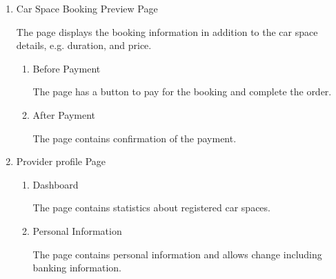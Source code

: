 \documentclass[12pt]{article}
\begin{document}
\begin{enumerate}
    \item
    \begin{description}
      \item[Car Space Booking Preview Page]
    \end{description}

    The page displays the booking information in addition to the car space details, e.g. duration, and price.

      \begin{enumerate}
        \item
        \begin{description}
          \item[Before Payment]
        \end{description}
  
        The page has a button to pay for the booking and complete the order.
  
        \item     
        \begin{description}
          \item[After Payment]
        \end{description}
  
        The page contains confirmation of the payment.
  
      \end{enumerate}

    \item
    \begin{description}
      \item[Provider profile Page]
    \end{description}

      \begin{enumerate}
        \item
        \begin{description}
          \item[Dashboard]
        \end{description}
    
        The page contains statistics about registered car spaces.
    
        \item     
        \begin{description}
          \item[Personal Information]
        \end{description}

        The page contains personal information and allows change including banking information.
    

\end{enumerate}
\end{enumerate}
\end{document}

